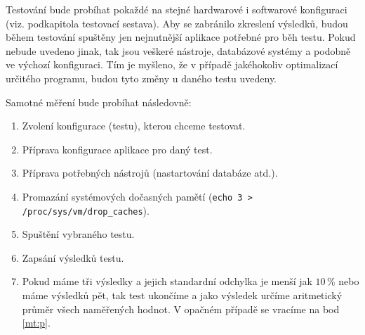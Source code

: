 Testování bude probíhat pokaždé na stejné hardwarové i softwarové konfiguraci (viz. podkapitola testovací sestava). Aby se zabránilo zkreslení výsledků, budou během testování spuštěny jen nejnutnější aplikace potřebné pro běh testu. Pokud nebude uvedeno jinak, tak jsou veškeré nástroje, databázové systémy a podobně ve výchozí konfiguraci. Tím je myšleno, že v případě jakéhokoliv optimalizací určitého programu, budou tyto změny u daného testu uvedeny.

Samotné měření bude probíhat následovně:
\begin{enumerate}
  \item Zvolení konfigurace (testu), kterou chceme testovat.
  \item Příprava konfigurace aplikace pro daný test.
  \item Příprava potřebných nástrojů (nastartování databáze atd.).
  \item Promazání systémových dočasných pamětí (\texttt{echo 3 > /proc/sys/vm/drop\_caches}).\label{mt:p}
  \item Spuštění vybraného testu.
  \item Zapsání výsledků testu.
  \item Pokud máme tři výsledky a jejich standardní odchylka je menší jak $10\,\%$ nebo máme výsledků pět, tak test ukončíme a jako výsledek určíme aritmetický průměr všech naměřených hodnot. V opačném případě se vracíme na bod \ref{mt:p}.
\end{enumerate}
